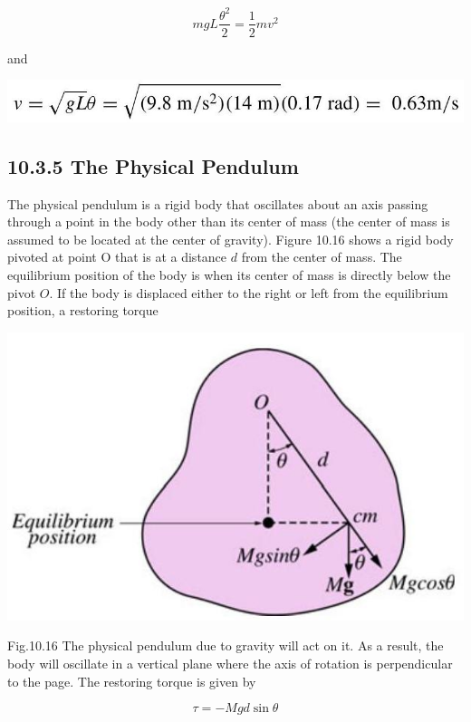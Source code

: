 \documentclass[10pt]{article}
\begin{document}
$$
m g L \frac{\theta^{2}}{2}=\frac{1}{2} m v^{2}
$$

and

\begin{center}
\includegraphics[max width=\textwidth]{2024_09_13_db1f357d2aad0a03eb2eg-171}
\end{center}

\subsection*{10.3.5 The Physical Pendulum}
The physical pendulum is a rigid body that oscillates about an axis passing through a point in the body other than its center of mass (the center of mass is assumed to be located at the center of gravity). Figure 10.16 shows a rigid body pivoted at point O that is at a distance $d$ from the center of mass. The equilibrium position of the body is when its center of mass is directly below the pivot $O$. If the body is displaced either to the right or left from the equilibrium position, a restoring torque

\begin{center}
\includegraphics[max width=\textwidth]{2024_09_13_db1f357d2aad0a03eb2eg-171(1)}
\end{center}

Fig.10.16 The physical pendulum due to gravity will act on it. As a result, the body will oscillate in a vertical plane where the axis of rotation is perpendicular to the page. The restoring torque is given by

$$
\tau=-M g d \sin \theta
$$
\end{document}
